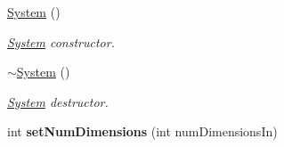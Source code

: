 \begin{DoxyCompactItemize}
\item 
\hyperlink{class_single_integrator_1_1_system_ae317936c9bcf1374d61745572e0f2f8a}{System} ()
\begin{DoxyCompactList}\small\item\em \hyperlink{class_single_integrator_1_1_system}{System} constructor. \end{DoxyCompactList}\item 
\hyperlink{class_single_integrator_1_1_system_a3be70bb338e3f062f821173fd15680d0}{$\sim$\-System} ()
\begin{DoxyCompactList}\small\item\em \hyperlink{class_single_integrator_1_1_system}{System} destructor. \end{DoxyCompactList}\item 
\hypertarget{class_single_integrator_1_1_system_aad4b2d6c08534cbf32d8417684a18954}{int {\bfseries set\-Num\-Dimensions} (int num\-Dimensions\-In)}\label{class_single_integrator_1_1_system_aad4b2d6c08534cbf32d8417684a18954}


\end{DoxyCompactItemize}
